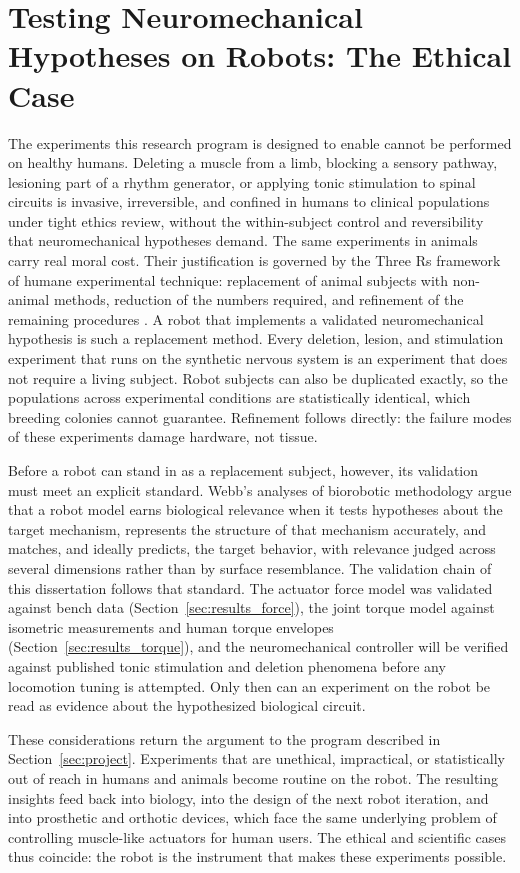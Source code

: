 \section{Testing Neuromechanical Hypotheses on Robots: The Ethical Case}\label{sec:bg_ethics}

The experiments this research program is designed to enable cannot be performed
on healthy humans. Deleting a muscle from a limb, blocking a sensory pathway,
lesioning part of a rhythm generator, or applying tonic stimulation to spinal
circuits is invasive, irreversible, and confined in humans to clinical
populations under tight ethics review, without the within-subject control and
reversibility that neuromechanical hypotheses demand. The same experiments in
animals carry real moral cost. Their justification is governed by the Three Rs
framework of humane experimental technique: replacement of animal subjects with
non-animal methods, reduction of the numbers required, and refinement of the
remaining procedures \citep{russell_principles_1959, tannenbaum_russell_2015}. A
robot that implements a validated neuromechanical hypothesis is such a
replacement method. Every deletion, lesion, and stimulation experiment that runs
on the synthetic nervous system is an experiment that does not require a living
subject. Robot subjects can also be duplicated exactly, so the populations
across experimental conditions are statistically identical, which breeding
colonies cannot guarantee. Refinement follows directly: the failure modes of
these experiments damage hardware, not tissue.

Before a robot can stand in as a replacement subject, however, its validation
must meet an explicit standard. Webb's analyses of biorobotic methodology
\citep{webb_robots_2001, webb_robots_2002} argue that a robot model earns
biological relevance when it tests hypotheses about the target mechanism,
represents the structure of that mechanism accurately, and matches, and ideally
predicts, the target behavior, with relevance judged across several dimensions
rather than by surface resemblance. The validation chain of this dissertation
follows that standard. The actuator force model was validated against bench
data (Section~\ref{sec:results_force}), the joint torque model against
isometric measurements and human torque envelopes
(Section~\ref{sec:results_torque}), and the neuromechanical controller will be
verified against published tonic stimulation and deletion phenomena
\citep{selionov_tonic_2009, rybak_modelling_2006} before any locomotion tuning
is attempted. Only then can an experiment on the robot be read as evidence
about the hypothesized biological circuit.

These considerations return the argument to the program described in
Section~\ref{sec:project}. Experiments that are unethical, impractical, or
statistically out of reach in humans and animals become routine on the robot.
The resulting insights feed back into biology, into the design of the next
robot iteration, and into prosthetic and orthotic devices, which face the same
underlying problem of controlling muscle-like actuators for human users. The
ethical and scientific cases thus coincide: the robot is the instrument that
makes these experiments possible.
